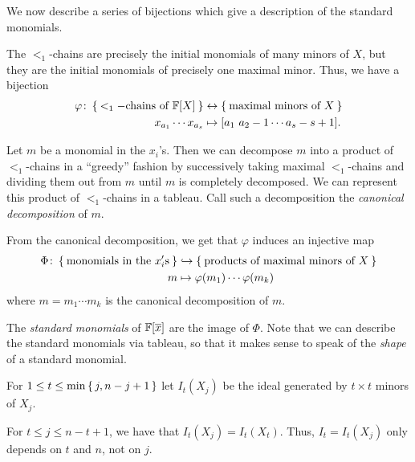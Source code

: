 \documentclass[letterpaper, 11pt]{amsart}
\begin{document}
We now describe a series of bijections which give a description of the standard monomials.
\begin{defn}
  The $<_1$-chains are precisely the initial monomials of many minors of $X$, but they are the initial monomials of precisely one maximal minor.
  Thus, we have a bijection
  \begin{align*}
    \varphi\colon \Set{<_1-\text{chains of } \mathbb{F}[X]} &\leftrightarrow \Set{\text{maximal minors of } X} \\
    x_{a_1} \cdots x_{a_s} &\mapsto [a_1\ a_{2} - 1 \cdots a_s - s + 1].
  \end{align*}
\end{defn}

\begin{defn}
  Let $m$ be a monomial in the $x_i$'s.
  Then we can decompose $m$ into a product of $<_1$-chains in a ``greedy'' fashion by successively taking maximal $<_1$-chains and dividing them out from $m$ until $m$ is completely decomposed.
  We can represent this product of $<_1$-chains in a tableau.
  Call such a decomposition the \emph{canonical decomposition} of $m$.
\end{defn}

\begin{defn}
  From the canonical decomposition, we get that $\varphi$ induces an injective map
  \begin{align*}
    \Phi\colon \Set{\text{monomials in the } x_i'\text{s}} &\into \Set{\text{products of maximal minors of } X} \\
    m &\mapsto \varphi(m_1) \cdots \varphi(m_k)
  \end{align*}
  where $m = m_1 \cdots m_k$ is the canonical decomposition of $m$.
\end{defn}

\begin{defn}
  The \emph{standard monomials} of $\mathbb{F}[\overline{x}]$ are the image of $\Phi$.
  Note that we can describe the standard monomials via tableau, so that it makes sense to speak of the \emph{shape} of a standard monomial.
\end{defn}

For $1 \leq t \leq \min\set{j, n - j + 1}$ let $I_t(X_j)$ be the ideal generated by $t \times t$ minors of $X_j$.
\begin{lem}
  For $t \leq j \leq n - t + 1$, we have that $I_t(X_j) = I_t(X_t)$.
  Thus, $I_t = I_t(X_j)$ only depends on $t$ and $n$, not on $j$.
\end{lem}
\end{document}
